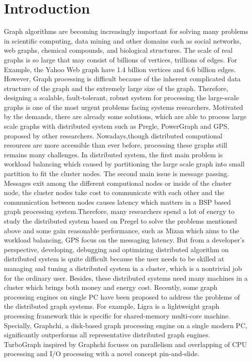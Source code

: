 \documentclass[twocolumn,a4paper,10pt]{article}
\begin{document}
\section{Introduction}
Graph algorithms are becoming increasingly important for solving many problems in scientific computing, data mining and other domains such as social networks, web graphs, chemical compounds, and biological structures. The scale of real graphs is so large that may consist of billions of vertices, trillions of edges. For Example, the Yahoo Web graph have 1.4 billion vertices and 6.6 billion edges. However, Graph processing is difficult because of the inherent complicated data structure of the graph and the extremely large size of the graph. Therefore, designing a scalable, fault-tolerant, robust system for processing the large-scale graphs is one of the most urgent problems facing systems researchers.
\newline
Motivated by the demands, there are already some solutions, which are able to process large scale graphs with distributed system such as Pregle, PowerGraph and GPS, proposed by other researchers. Nowadays,though distributed computional resources are more accessible than ever before, processing these graphs still remains many challenges. In distributed system, the first main problem is workload balancing which caused by partitioning the large scale graph into small partition to fit the cluster nodes. The second main issue is message passing. Messages exit among the different computional nodes or inside of the cluster node, the cluster nodes take cost to communicate with each other and the communication between nodes causes latency which matters in a BSP based graph processing system.Therefore, many researchers spend a lot of energy to study the distributed system based on Pregel to solve the problems mentioned above and some gain reasonable performance, such as Mizan which aims to the workload balancing, GPS focus on the messaging latency. But from a developer’s perspective, developing, debugging and optimizing distributed algorithm on distributed system is quite difficult because the user needs to be skilled at managing and tuning a distributed system in a cluster, which is a nontrivial job for the ordinary user. Besides, these distributed systems need many machines in a cluster which brings both money and energy cost.
\newline
Recently, some graph processing engines on single PC have been proposed to address the problems of the distributed graph systems. For example, Ligra is a lightweight graph processing framework this is specific for shared-memory multi-core machine. Specially, Graphchi, a disk-based graph processing engine on a single modern PC, significantly outperforms all representative distributed graph engines. TurboGraph inspired by Graphchi focuses on parallelism and overlapping of CPU processing and I/O processing with a novel concept pin-and-slide.
\end{document}
